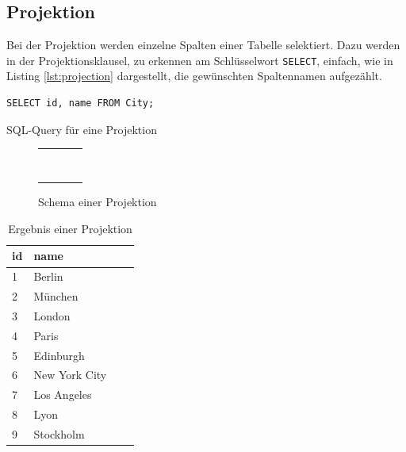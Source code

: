 \documentclass[a4paper]{article}
\begin{document}
\newpage
\subsection{Projektion}
Bei der Projektion werden einzelne Spalten einer Tabelle selektiert. Dazu werden in der Projektionsklausel, zu erkennen am Schlüsselwort \texttt{SELECT}, einfach, wie in Listing \ref{lst:projection} dargestellt, die gewünschten Spaltennamen aufgezählt.

\begin{listing}[H]
\begin{verbatim}
SELECT id, name FROM City;
\end{verbatim}
\caption{SQL-Query für eine Projektion}
\label{lst:projection}
\end{listing}

\begin{figure}[H]
\centering
  \begin{tabular}{| c | c | c | c |}
    \hline
     \cellcolor{cell} & \cellcolor{cell} & & \\ \hline
     \cellcolor{cell} & \cellcolor{cell} & & \\ \hline
     \cellcolor{cell} & \cellcolor{cell} & & \\ \hline
     \cellcolor{cell} & \cellcolor{cell} & & \\ \hline
     \cellcolor{cell} & \cellcolor{cell} & & \\ \hline
     \cellcolor{cell} & \cellcolor{cell} & & \\ \hline
     \cellcolor{cell} & \cellcolor{cell} & & \\ \hline
     \cellcolor{cell} & \cellcolor{cell} & & \\ \hline
     \cellcolor{cell} & \cellcolor{cell} & & \\ \hline
  \end{tabular}
\caption{Schema einer Projektion}
\label{fig:projection}
\end{figure}

\begin{table}[H]
\centering
  \begin{tabular}{| l | l | l | l |}
    \hline
    id & name \\ \hline
    \hline
   1 & Berlin \\ \hline
   2 & München \\ \hline
   3 & London \\ \hline
   4 & Paris \\ \hline
   5 & Edinburgh \\ \hline
   6 & New York City \\ \hline
   7 & Los Angeles \\ \hline
   8 & Lyon \\ \hline
   9 & Stockholm \\ \hline
  \end{tabular}
\caption{Ergebnis einer Projektion}
\label{tab:projection}
\end{table}
\end{document}
